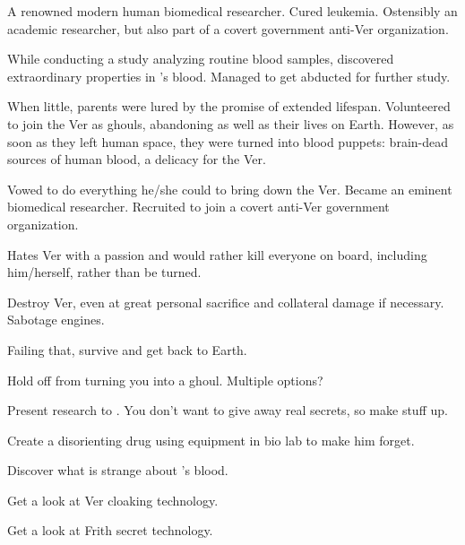 \documentclass[char]{guildcamp4}
\begin{document}
\name{\cSpite{}}

\begin{itemz}[Backstory]
    \item A renowned modern human biomedical researcher. Cured leukemia. Ostensibly an academic researcher, but also part of a covert government anti-Ver organization.
    \item While conducting a study analyzing routine blood samples, discovered extraordinary properties in \cPlead{}'s blood. Managed to get \cPlead{} abducted for further study.
    \item When little, parents were lured by the promise of extended lifespan. Volunteered to join the Ver as ghouls, abandoning \cSpite{} as well as their lives on Earth. However, as soon as they left human space, they were turned into blood puppets: brain-dead sources of human blood, a delicacy for the Ver.
    \item Vowed to do everything he/she could to bring down the Ver. Became an eminent biomedical researcher. Recruited to join a covert anti-Ver government organization.
    \item Hates Ver with a passion and would rather kill everyone on board, including him/herself, rather than be turned.
\end{itemz}

\begin{itemz}[Goals]
	\item Destroy Ver, even at great personal sacrifice and collateral damage if necessary. Sabotage engines.
	\item Failing that, survive and get back to Earth.
	\item Hold off \cVone{} from turning you into a ghoul. Multiple options?
		\begin {itemz}
			\item Present research to \cVone{}. You don't want to give away real secrets, so make stuff up.
			\item Create a disorienting drug using equipment in bio lab to make him forget.
			\item 
		\end {itemz}
	\item Discover what is strange about \cPlead{}'s blood.
	\item Get a look at Ver cloaking technology.
	\item Get a look at Frith secret technology.
\end{itemz}

\begin{itemz}[Notes]
	\item 
\end{itemz}

\begin{contacts}
	\contact{\cTest{}}
\end{contacts}
\end{document}
